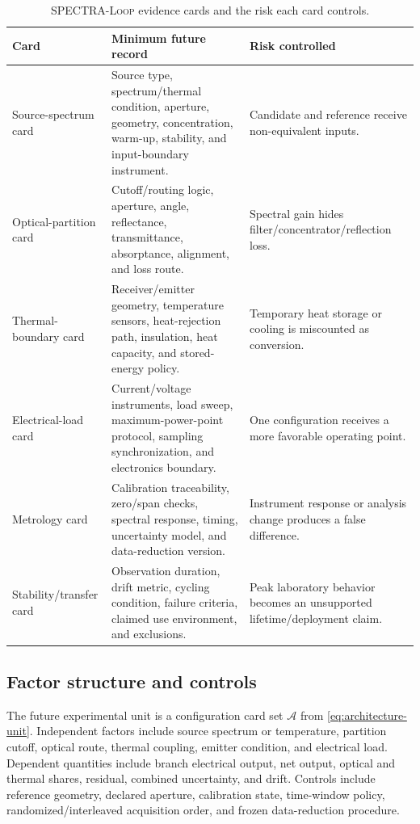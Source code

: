 \documentclass[conference]{../../../../Conference-LaTeX-template_10-17-19/IEEEtran}
\newcommand{\spectraloop}{\textsc{SPECTRA-Loop}}
\begin{document}
\begin{table}[!t]
\caption{\spectraloop{} evidence cards and the risk each card controls.}
\label{tab:cards}
\centering
\small
\begin{tabularx}{\textwidth}{lY Y}
\toprule
Card & Minimum future record & Risk controlled \\
\midrule
Source-spectrum card & Source type, spectrum/thermal condition, aperture, geometry, concentration, warm-up, stability, and input-boundary instrument. & Candidate and reference receive non-equivalent inputs. \\
Optical-partition card & Cutoff/routing logic, aperture, angle, reflectance, transmittance, absorptance, alignment, and loss route. & Spectral gain hides filter/concentrator/reflection loss. \\
Thermal-boundary card & Receiver/emitter geometry, temperature sensors, heat-rejection path, insulation, heat capacity, and stored-energy policy. & Temporary heat storage or cooling is miscounted as conversion. \\
Electrical-load card & Current/voltage instruments, load sweep, maximum-power-point protocol, sampling synchronization, and electronics boundary. & One configuration receives a more favorable operating point. \\
Metrology card & Calibration traceability, zero/span checks, spectral response, timing, uncertainty model, and data-reduction version. & Instrument response or analysis change produces a false difference. \\
Stability/transfer card & Observation duration, drift metric, cycling condition, failure criteria, claimed use environment, and exclusions. & Peak laboratory behavior becomes an unsupported lifetime/deployment claim. \\
\bottomrule
\end{tabularx}
\end{table}

\subsection{Factor structure and controls}
The future experimental unit is a configuration card set $\mathcal{A}$ from \eqref{eq:architecture-unit}. Independent factors include source spectrum or temperature, partition cutoff, optical route, thermal coupling, emitter condition, and electrical load. Dependent quantities include branch electrical output, net output, optical and thermal shares, residual, combined uncertainty, and drift. Controls include reference geometry, declared aperture, calibration state, time-window policy, randomized/interleaved acquisition order, and frozen data-reduction procedure.
\end{document}
